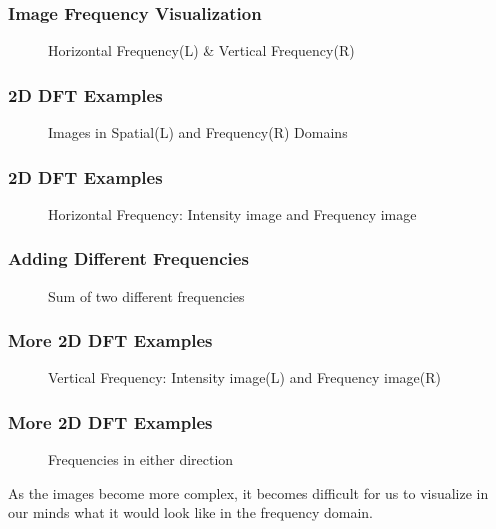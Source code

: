 \documentclass[compress]{beamer}
\begin{document}
  \begin{frame}
    \frametitle{Image Frequency Visualization}
    \begin{figure}[H]
      \centering
      \caption{Horizontal Frequency(L) \& Vertical Frequency(R)}
      \label{fig:}
    \end{figure}
  \end{frame}

  \begin{frame}
    \frametitle{2D DFT Examples}
    \begin{figure}[H]
      \centering
      \caption{Images in Spatial(L) and Frequency(R) Domains}
      \label{Images in Spatial(L) and Frequency(R) Domains}
    \end{figure}
    
  \end{frame}
  
  \begin{frame}
    \frametitle{2D DFT Examples}
    \begin{figure}[H]
      \centering
      \caption{Horizontal Frequency: Intensity image and Frequency image}
      \label{fig:-images-rect4160-png}
    \end{figure}
  \end{frame}

  \begin{frame}
    \frametitle{Adding Different Frequencies}
    \begin{figure}[H]
      \centering
      \caption{Sum of two different frequencies}
      \label{fig:-images-rectadded-png}
    \end{figure}
  \end{frame}
  
  \begin{frame}
    \frametitle{More 2D DFT Examples}
    \begin{figure}[H]
      \centering
      \caption{Vertical Frequency: Intensity image(L) and Frequency image(R)}
      \label{fig:-images-rect4160-png}
    \end{figure}
  \end{frame}

  \begin{frame}
    \frametitle{More 2D DFT Examples}
    \begin{figure}[H]
      \centering
      \caption{Frequencies in either direction}
    \end{figure}
  \end{frame}

  \begin{frame}

    As the images become more complex, it becomes difficult for us to visualize
    in our minds what it would look like in the frequency domain.
    
  \end{frame}
\end{document}
